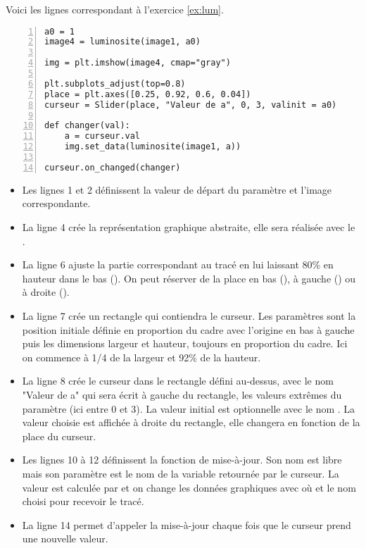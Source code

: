 Voici les lignes correspondant à l'exercice \ref{ex:lum}.
\begin{lstlisting}[numbers=left]
a0 = 1
image4 = luminosite(image1, a0)

img = plt.imshow(image4, cmap="gray")

plt.subplots_adjust(top=0.8)
place = plt.axes([0.25, 0.92, 0.6, 0.04])
curseur = Slider(place, "Valeur de a", 0, 3, valinit = a0)

def changer(val):
    a = curseur.val
    img.set_data(luminosite(image1, a))   

curseur.on_changed(changer)
\end{lstlisting}
\begin{itemize}
  \item Les lignes 1 et 2 définissent la valeur de départ du paramètre et l'image correspondante.
  \item La ligne 4 crée la représentation graphique abstraite, elle sera réalisée avec le .
  \item La ligne 6 ajuste la partie correspondant au tracé en lui laissant 80\% en hauteur dans le bas (). On peut réserver de la place en bas (), à gauche () ou à droite ().
  \item La ligne 7 crée un rectangle qui contiendra le curseur. Les paramètres sont la position initiale définie en proportion du cadre avec l'origine en bas à gauche puis les dimensions largeur et hauteur, toujours en proportion du cadre. Ici on commence à 1/4 de la largeur et 92\% de la hauteur.
  \item La ligne 8 crée le curseur dans le rectangle  défini au-dessus, avec le nom "Valeur de a" qui sera écrit à gauche du rectangle, les valeurs extrêmes du paramètre (ici entre 0 et 3). La valeur initial est optionnelle avec le nom .  
  La valeur choisie est affichée à droite du rectangle, elle changera en fonction de la place du curseur.
  \item Les lignes 10 à 12 définissent la fonction de mise-à-jour. Son nom est libre mais son paramètre est le nom de la variable retournée par le curseur. La valeur est calculée par  et on change les données graphiques avec  où  et le nom choisi pour recevoir le tracé.
  
\item La ligne 14 permet d'appeler la mise-à-jour chaque fois que le curseur prend une nouvelle valeur.
\end{itemize}
\newpage
